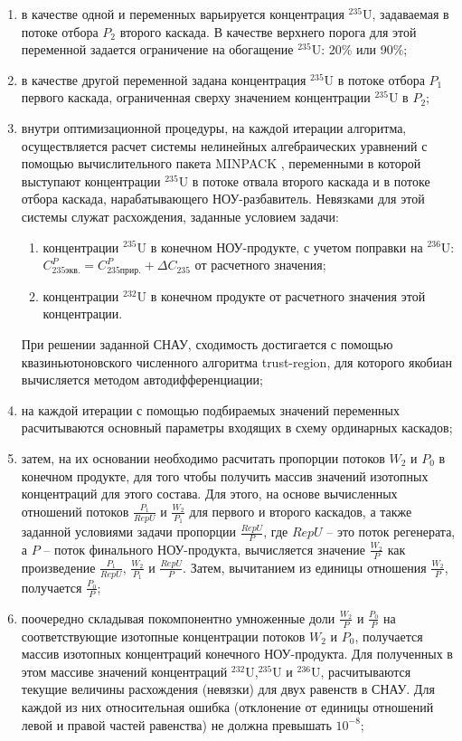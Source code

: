 \begin{enumerate}
    \item в качестве одной и переменных варьируется концентрация $^{235}$U, задаваемая в потоке отбора $P_2$ второго каскада. В качестве верхнего порога для этой переменной задается ограничение на обогащение $^{235}$U: 20\% или 90\%;
    \item в качестве другой переменной задана концентрация $^{235}$U в потоке отбора $P_1$ первого каскада, ограниченная сверху значением концентрации $^{235}$U в $P_2$;
    \item внутри оптимизационной процедуры, на каждой итерации алгоритма, осуществляется расчет системы нелинейных алгебраических уравнений с помощью вычислительного пакета MINPACK \cite{moreMINPACK}, переменными в которой выступают концентрации $^{235}$U в потоке отвала второго каскада и в потоке отбора каскада, нарабатывающего НОУ-разбавитель. Невязками для этой системы служат расхождения, заданные условием задачи:
    \begin{enumerate}
        \item концентрации $^{235}$U в  конечном НОУ-продукте, с учетом поправки на $^{236}$U: $C_{235 экв.}^{P}=C_{235 прир.}^{P}+\Delta C_{235}$ от расчетного значения;
        \item концентрации $^{232}$U в конечном продукте от расчетного значения этой концентрации.
    \end{enumerate}
    При решении заданной СНАУ, сходимость достигается с помощью квазиньютоновского численного алгоритма trust-region, для которого якобиан вычисляется методом автодифференциации;
    \item  на каждой итерации с помощью подбираемых значений переменных расчитываются основный параметры входящих в схему ординарных каскадов;
    \item  затем, на их основании необходимо расчитать пропорции потоков $W_2$ и $P_0$ в конечном продукте, для того чтобы получить массив значений изотопных концентраций для этого состава. Для этого, на основе вычисленных отношений потоков $\frac{P_{1}}{RepU}$ и $\frac{W_{2}}{P_{1}}$ для первого и второго каскадов, а также заданной условиями задачи пропорции $\frac{RepU}{P}$, где $RepU$ -- это поток регенерата, а $P$ -- поток финального НОУ-продукта, вычисляется значение $\frac{W_{2}}{P}$ как произведение $\frac{P_{1}}{RepU}$, $\frac{W_{2}}{P_{1}}$ и $\frac{RepU}{P}$. Затем, вычитанием из единицы отношения $\frac{W_{2}}{P}$, получается $\frac{P_{0}}{P}$;
    \item поочередно складывая покомпонентно умноженные доли $\frac{W_{2}}{P}$ и $\frac{P_{0}}{P}$ на соответствующие изотопные концентрации потоков $W_2$ и $P_0$, получается массив изотопных концентраций конечного НОУ-продукта. Для полученных в этом массиве значений концентраций $^{232}$U,$^{235}$U и $^{236}$U, расчитываются текущие величины расхождения (невязки) для двух равенств в СНАУ. Для каждой из них относительная ошибка (отклонение от единицы отношений левой и правой частей равенства) не должна превышать $10^{-8}$;

\end{enumerate}
